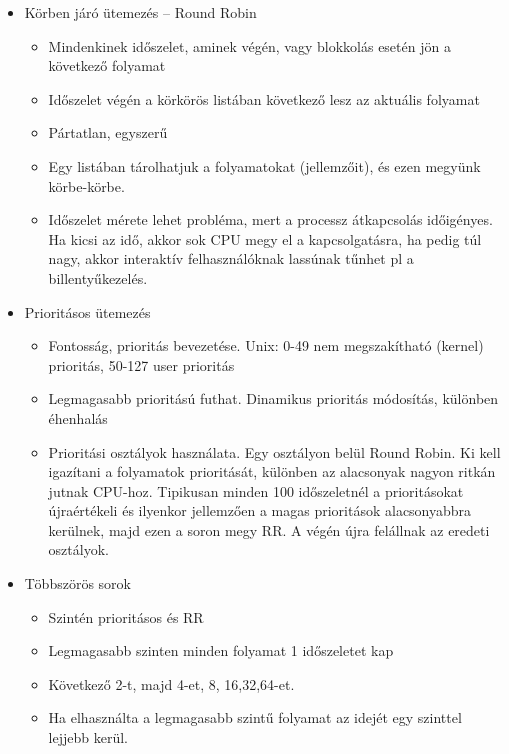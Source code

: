 \documentclass[margin=0px]{article}
\begin{document}
\begin{itemize}
    \item Körben járó ütemezés -- Round Robin
          \begin{itemize}
              \item Mindenkinek időszelet, aminek végén, vagy blokkolás esetén jön a következő folyamat
              \item Időszelet végén a körkörös listában következő lesz az aktuális folyamat
              \item Pártatlan, egyszerű
              \item Egy listában tárolhatjuk a folyamatokat (jellemzőit), és ezen megyünk körbe-körbe.
              \item Időszelet mérete lehet probléma, mert a processz átkapcsolás időigényes. Ha kicsi az idő, akkor sok CPU megy el a kapcsolgatásra, ha pedig túl nagy, akkor interaktív felhasználóknak lassúnak tűnhet pl a billentyűkezelés.
          \end{itemize}
    \item Prioritásos ütemezés
          \begin{itemize}
              \item Fontosság, prioritás bevezetése. Unix: 0-49 nem megszakítható (kernel) prioritás, 50-127 user prioritás
              \item Legmagasabb prioritású futhat. Dinamikus prioritás módosítás, különben éhenhalás
              \item Prioritási osztályok használata. Egy osztályon belül Round Robin. Ki kell igazítani a folyamatok prioritását, különben az alacsonyak nagyon ritkán jutnak CPU-hoz. Tipikusan minden 100 időszeletnél a prioritásokat újraértékeli és ilyenkor jellemzően a magas prioritások alacsonyabbra kerülnek, majd ezen a soron megy RR. A végén újra felállnak az eredeti osztályok.
          \end{itemize}
    \item Többszörös sorok
          \begin{itemize}
              \item Szintén prioritásos és RR
              \item Legmagasabb szinten minden folyamat 1 időszeletet kap
              \item Következő 2-t, majd 4-et, 8, 16,32,64-et.
              \item Ha elhasználta a legmagasabb szintű folyamat az idejét egy szinttel lejjebb kerül.
          \end{itemize}

\end{itemize}
\end{document}
